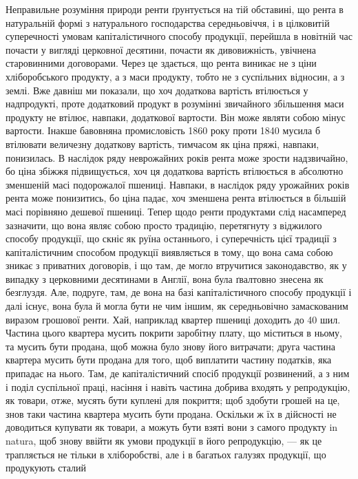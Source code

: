 Неправильне розуміння природи ренти ґрунтується на тій обставині, що
рента в натуральній формі з натурального господарства середньовіччя, і в цілковитій
суперечності умовам капіталістичного способу продукції, перейшла в новітній
час почасти у вигляді церковної десятини, почасти як дивовижність, увічнена
старовинними договорами. Через це здається, що рента виникає не з ціни
хліборобського продукту, а з маси продукту, тобто не з суспільних відносин,
а з землі. Вже давніш ми показали, що хоч додаткова вартість втілюється у
надпродукті, проте додатковий продукт в розумінні звичайного збільшення маси
продукту не втілює, навпаки, додаткової вартости. Він може являти собою мінус
вартости. Інакше бавовняна промисловість 1860 року проти 1840 мусила б
втілювати величезну додаткову вартість, тимчасом як ціна пряжі, навпаки, понизилась. В наслідок ряду
неврожайних років рента може зрости надзвичайно,
бо ціна збіжжя підвищується, хоч ця додаткова вартість втілюється в абсолютно
зменшеній масі подорожалої пшениці. Навпаки, в наслідок ряду урожайних
років рента може понизитись, бо ціна падає, хоч зменшена рента втілюється в
більшій масі порівняно дешевої пшениці. Тепер щодо ренти продуктами слід
насамперед зазначити, що вона являє собою просто традицію, перетягнуту з віджилого
способу продукції, що скніє як руїна останнього, і суперечність цієї
традиції з капіталістичним способом продукції виявляється в тому, що вона
сама собою зникає з приватних договорів, і що там, де могло втручитися законодавство,
як у випадку з церковними десятинами в Англії, вона була ґвалтовно
знесена як безглуздя. Але, подруге, там, де вона на базі капіталістичного
способу продукції і далі існує, вона була й могла бути не чим іншим, як
середньовічно замаскованим виразом грошової ренти. Хай, наприклад квартер
пшениці доходить до 40 шил. Частина цього квартера мусить покрити заробітну
плату, що міститься в ньому, та мусить бути продана, щоб можна було знову
його витрачати; друга частина квартера мусить бути продана для того, щоб виплатити
частину податків, яка припадає на нього. Там, де капіталістичний
спосіб продукції розвинений, а з ним і поділ суспільної праці, насіння і навіть
частина добрива входять у репродукцію, як товари, отже, мусять бути куплені
для покриття; щоб здобути грошей на це, знов таки частина квартера мусить
бути продана. Оскільки ж їх в дійсності не доводиться купувати як товари,
а можуть бути взяті вони з самого продукту in natura, щоб знову
ввійти як умови продукції в його репродукцію, — як це трапляється не тільки
в хліборобстві, але і в багатьох галузях продукції, що продукують сталий
\parbreak{}  %
